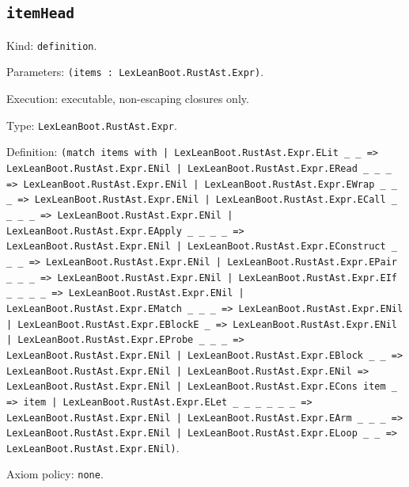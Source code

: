 \documentclass[11pt]{article}
\begin{document}
\subsection*{\texttt{itemHead}}
\noindent Kind: \texttt{definition}.\par
\noindent Parameters: \texttt{(items : LexLeanBoot.RustAst.Expr)}.\par
\noindent Execution: executable, non-escaping closures only.\par
\noindent Type: \texttt{LexLeanBoot.RustAst.Expr}.\par
\noindent Definition: \texttt{(match items with | LexLeanBoot.RustAst.Expr.ELit \_ \_ => LexLeanBoot.RustAst.Expr.ENil | LexLeanBoot.RustAst.Expr.ERead \_ \_ \_ => LexLeanBoot.RustAst.Expr.ENil | LexLeanBoot.RustAst.Expr.EWrap \_ \_ \_ => LexLeanBoot.RustAst.Expr.ENil | LexLeanBoot.RustAst.Expr.ECall \_ \_ \_ \_ => LexLeanBoot.RustAst.Expr.ENil | LexLeanBoot.RustAst.Expr.EApply \_ \_ \_ \_ => LexLeanBoot.RustAst.Expr.ENil | LexLeanBoot.RustAst.Expr.EConstruct \_ \_ \_ => LexLeanBoot.RustAst.Expr.ENil | LexLeanBoot.RustAst.Expr.EPair \_ \_ \_ => LexLeanBoot.RustAst.Expr.ENil | LexLeanBoot.RustAst.Expr.EIf \_ \_ \_ \_ => LexLeanBoot.RustAst.Expr.ENil | LexLeanBoot.RustAst.Expr.EMatch \_ \_ \_ => LexLeanBoot.RustAst.Expr.ENil | LexLeanBoot.RustAst.Expr.EBlockE \_ => LexLeanBoot.RustAst.Expr.ENil | LexLeanBoot.RustAst.Expr.EProbe \_ \_ \_ => LexLeanBoot.RustAst.Expr.ENil | LexLeanBoot.RustAst.Expr.EBlock \_ \_ => LexLeanBoot.RustAst.Expr.ENil | LexLeanBoot.RustAst.Expr.ENil => LexLeanBoot.RustAst.Expr.ENil | LexLeanBoot.RustAst.Expr.ECons item \_ => item | LexLeanBoot.RustAst.Expr.ELet \_ \_ \_ \_ \_ \_ => LexLeanBoot.RustAst.Expr.ENil | LexLeanBoot.RustAst.Expr.EArm \_ \_ \_ => LexLeanBoot.RustAst.Expr.ENil | LexLeanBoot.RustAst.Expr.ELoop \_ \_ => LexLeanBoot.RustAst.Expr.ENil)}.\par
\noindent Axiom policy: \texttt{none}.\par
\end{document}
